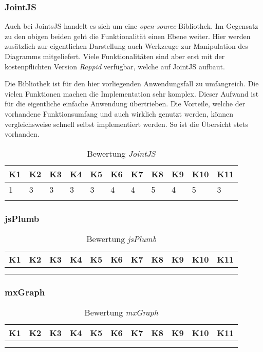 \subsubsection{JointJS}
Auch bei JointsJS handelt es sich um eine \textit{open-source}-Bibliothek. Im Gegensatz zu den obigen beiden geht die Funktionalität einen Ebene weiter. Hier werden zusätzlich zur eigentlichen Darstellung auch Werkzeuge zur Manipulation des Diagramms mitgeliefert. Viele Funktionalitäten sind aber erst mit der kostenpflichten Version \textit{Rappid} verfügbar, welche auf JointJS aufbaut. \cite{jointsjs}

Die Bibliothek ist für den hier vorliegenden Anwendungsfall zu umfangreich. Die vielen Funktionen machen die Implementation sehr komplex. Dieser Aufwand ist für die eigentliche einfache Anwendung übertrieben. Die Vorteile, welche der vorhandene Funktionsumfang und auch wirklich genutzt werden, können vergleichsweise schnell selbst implementiert werden. So ist die Übersicht stets vorhanden.

\begin{longtable}{|p{0.5cm}|p{0.5cm}|p{0.5cm}|p{0.5cm}|p{0.5cm}|p{0.5cm}|p{0.5cm}|p{0.5cm}|p{0.5cm}|p{0.7cm}|p{0.7cm}|}
  \hline
    K1 & K2 & K3 & K4 & K5 & K6 & K7 & K8 & K9 & K10 & K11 \\\hline
    1 & 3 & 3 & 3 & 3 & 4 & 4 & 5 & 4 & 5 & 3\\\hline
    \caption{Bewertung \textit{JointJS}}
  \label{tab:bewertung-jointjs}
\end{longtable}

\subsubsection{jsPlumb}

\begin{longtable}{|p{0.5cm}|p{0.5cm}|p{0.5cm}|p{0.5cm}|p{0.5cm}|p{0.5cm}|p{0.5cm}|p{0.5cm}|p{0.5cm}|p{0.7cm}|p{0.7cm}|}
  \hline
    K1 & K2 & K3 & K4 & K5 & K6 & K7 & K8 & K9 & K10 & K11 \\\hline
    & & & & & & & & & &\\\hline
    \caption{Bewertung \textit{jsPlumb}}
  \label{tab:bewertung-jsplumb}
\end{longtable}


\subsubsection{mxGraph}

\begin{longtable}{|p{0.5cm}|p{0.5cm}|p{0.5cm}|p{0.5cm}|p{0.5cm}|p{0.5cm}|p{0.5cm}|p{0.5cm}|p{0.5cm}|p{0.7cm}|p{0.7cm}|}
  \hline
    K1 & K2 & K3 & K4 & K5 & K6 & K7 & K8 & K9 & K10 & K11 \\\hline
    & & & & & & & & & &\\\hline
    \caption{Bewertung \textit{mxGraph}}
  \label{tab:bewertung-mxgraph}
\end{longtable}
 
